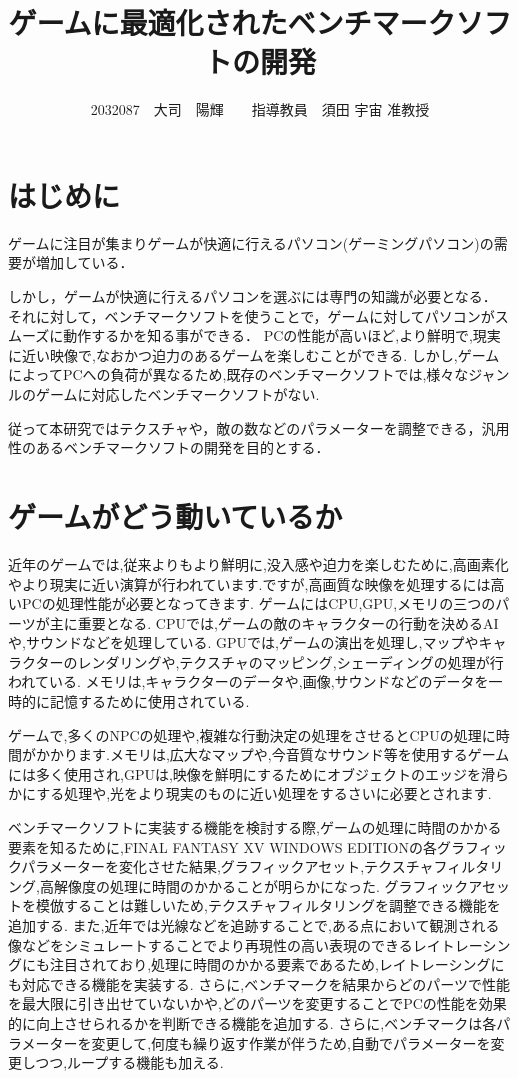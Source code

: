 \documentclass[twocolumn,10pt,a4j]{ltjsarticle}
\title{ゲームに最適化されたベンチマークソフトの開発}
\author{2032087　大司　陽輝　　指導教員　須田 宇宙 准教授}
\date{}
\begin{document}
\maketitle

\section{はじめに}
ゲームに注目が集まりゲームが快適に行えるパソコン(ゲーミングパソコン)の需要が増加している．


しかし，ゲームが快適に行えるパソコンを選ぶには専門の知識が必要となる．
それに対して，ベンチマークソフトを使うことで，ゲームに対してパソコンがスムーズに動作するかを知る事ができる．
PCの性能が高いほど,より鮮明で,現実に近い映像で,なおかつ迫力のあるゲームを楽しむことができる.
しかし,ゲームによってPCへの負荷が異なるため,既存のベンチマークソフトでは,様々なジャンルのゲームに対応したベンチマークソフトがない.

従って本研究ではテクスチャや，敵の数などのパラメーターを調整できる，汎用性のあるベンチマークソフトの開発を目的とする．

\section{ゲームがどう動いているか}
近年のゲームでは,従来よりもより鮮明に,没入感や迫力を楽しむために,高画素化やより現実に近い演算が行われています.ですが,高画質な映像を処理するには高いPCの処理性能が必要となってきます.
ゲームにはCPU,GPU,メモリの三つのパーツが主に重要となる.
CPUでは,ゲームの敵のキャラクターの行動を決めるAIや,サウンドなどを処理している.
GPUでは,ゲームの演出を処理し,マップやキャラクターのレンダリングや,テクスチャのマッピング,シェーディングの処理が行われている.
メモリは,キャラクターのデータや,画像,サウンドなどのデータを一時的に記憶するために使用されている.

ゲームで,多くのNPCの処理や,複雑な行動決定の処理をさせるとCPUの処理に時間がかかります.メモリは,広大なマップや,今音質なサウンド等を使用するゲームには多く使用され,GPUは,映像を鮮明にするためにオブジェクトのエッジを滑らかにする処理や,光をより現実のものに近い処理をするさいに必要とされます.


ベンチマークソフトに実装する機能を検討する際,ゲームの処理に時間のかかる要素を知るために,FINAL FANTASY XV WINDOWS EDITIONの各グラフィックパラメーターを変化させた結果,グラフィックアセット,テクスチャフィルタリング,高解像度の処理に時間のかかることが明らかになった.
グラフィックアセットを模倣することは難しいため,テクスチャフィルタリングを調整できる機能を追加する.
また,近年では光線などを追跡することで,ある点において観測される像などをシミュレートすることでより再現性の高い表現のできるレイトレーシングにも注目されており,処理に時間のかかる要素であるため,レイトレーシングにも対応できる機能を実装する.
さらに,ベンチマークを結果からどのパーツで性能を最大限に引き出せていないかや,どのパーツを変更することでPCの性能を効果的に向上させられるかを判断できる機能を追加する.
さらに,ベンチマークは各パラメーターを変更して,何度も繰り返す作業が伴うため,自動でパラメーターを変更しつつ,ループする機能も加える.
\end{document}
